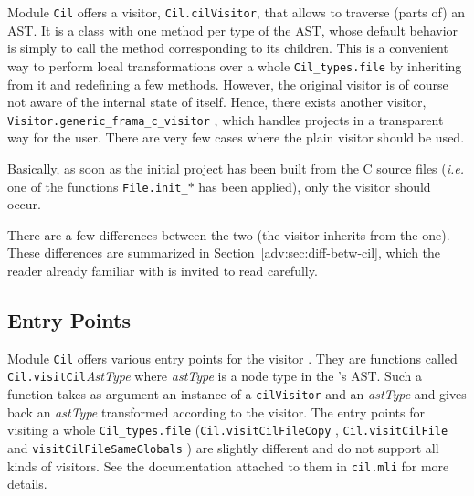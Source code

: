 Module \texttt{Cil} offers a visitor,
\verb+Cil.cilVisitor+,
that allows to traverse (parts of) an
AST. It is a class with one method per type of the AST, whose
default behavior is simply to call the method corresponding to its
children. This is a convenient way to perform local transformations over a
whole \verb+Cil_types.file+ by inheriting from it
and redefining a few methods. However, the original \cil visitor is of course
not aware of the internal state of \framac itself. Hence,
there exists another visitor, \verb+Visitor.generic_frama_c_visitor+%
, which handles
projects in a transparent way for the user. There are very few
cases where the plain \cil visitor should be used.

\begin{important}
  Basically, as soon as the initial project has been
  built from the C source files (\emph{i.e.} one of the functions
  \texttt{File.init\_$*$}%
   has been applied), only the \framac
  visitor should occur.
\end{important}

There are a few differences between the two (the \framac visitor
inherits from the \cil one).  These differences are summarized in
Section~\ref{adv:sec:diff-betw-cil}, which the reader already familiar with
\cil is invited to read carefully.

\subsection{Entry Points}

Module \texttt{Cil} offers various entry points for the visitor%
. They are functions called
\verb+Cil.visitCil+\emph{AstType} where
\emph{astType} is a node type in the \cil's AST. Such a function takes as
argument an instance of a \verb+cilVisitor+ and an
\emph{astType} and gives back an \emph{astType} transformed according to the
visitor. The entry points for visiting a whole
\verb+Cil_types.file+ (\verb+Cil.visitCilFileCopy+%
, \verb+Cil.visitCilFile+%
 and \verb+visitCilFileSameGlobals+%
) are slightly different and do not
support all kinds of visitors.  See the documentation attached to them in
\verb+cil.mli+ for more details.


